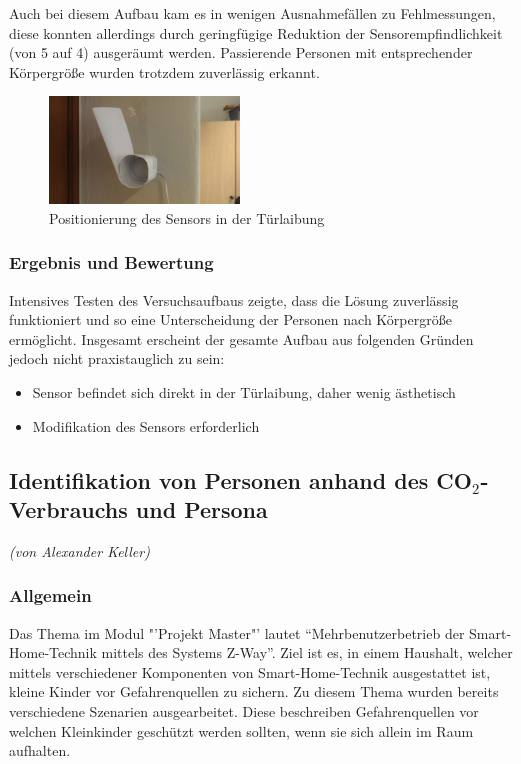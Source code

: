 Auch bei diesem Aufbau kam es in wenigen Ausnahmefällen zu Fehlmessungen, diese konnten allerdings durch geringfügige Reduktion der Sensorempfindlichkeit (von 5 auf 4) ausgeräumt werden. Passierende Personen mit entsprechender Körpergröße wurden trotzdem zuverlässig erkannt.

\begin{figure}[h!]
	\centering
	\includegraphics[width=0.45\textwidth]{img/PersonIdentification/Aeotec2.jpg}
	\caption{Positionierung des Sensors in der Türlaibung}
	\label{fig:personIdentificationAeotec2}
\end{figure}

\subsubsection{Ergebnis und Bewertung}
Intensives Testen des Versuchsaufbaus zeigte, dass die Lösung zuverlässig funktioniert und so eine Unterscheidung der Personen nach Körpergröße ermöglicht. Insgesamt erscheint der gesamte Aufbau aus folgenden Gründen jedoch nicht praxistauglich zu sein:
\begin{itemize}
	\item Sensor befindet sich direkt in der Türlaibung, daher wenig ästhetisch
	\item Modifikation des Sensors erforderlich
\end{itemize}

\subsection{Identifikation von Personen anhand des CO$_2$-Verbrauchs und Persona}
\label{subsec:identifkationPersona}
\emph{(von Alexander Keller)}

\subsubsection{Allgemein}
Das Thema im Modul "'Projekt Master"' lautet "`Mehrbenutzerbetrieb der Smart-Home-Technik mittels des Systems Z-Way"'. Ziel ist es, in einem Haushalt, welcher mittels verschiedener Komponenten von Smart-Home-Technik ausgestattet ist, kleine Kinder vor Gefahrenquellen zu sichern. Zu diesem Thema wurden bereits verschiedene Szenarien ausgearbeitet. Diese beschreiben Gefahrenquellen vor welchen Kleinkinder geschützt werden sollten, wenn sie sich allein im Raum aufhalten.


